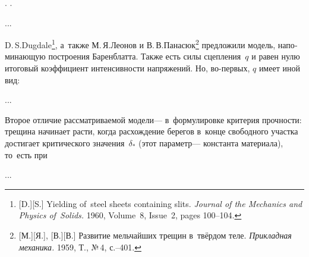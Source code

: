 


   .
       .
~

...




\begin{otherlanguage}{russian}

D.\,S.\;Dugdale\footnote{[D.][S.] Yielding of~steel sheets containing slits. \emph{Journal of the Mechanics and Physics of~Solids.} 1960, Volume~8, Issue~2, pages 100\hbox{--}104.
}\hspace{-0.4ex}, а~также М.\,Я.\;Леонов и В.\,В.\;Панасюк\footnote{[М.][Я.], [В.][В.] Развитие мельчайших трещин в~твёрдом теле. \emph{Прикладная механика.} 1959, Т., №\,4, с.\hbox{--}401.} предложили модель, напоминающую построения Баренблатта.
Также есть силы сцепления~$q$ и равен нулю итоговый коэффициент интенсивности напряжений.
Но, во\hbox{-}первых, $q$ имеет иной вид:

...

Второе отличие рассматриваемой модели\:---
в~формулировке критерия прочности:
трещина начинает расти,
когда расхождение берегов
в~конце свободного участка
достигает критического значения~$\delta_{*}$
(этот параметр\:--- константа материала),
то~есть при

...



\end{otherlanguage}

